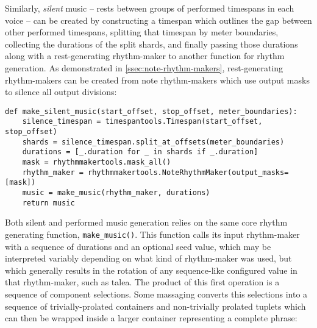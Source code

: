 \noindent Similarly, \emph{silent} music -- rests between groups of performed
timespans in each voice -- can be created by constructing a timespan which
outlines the gap between other performed timespans, splitting that timespan by
meter boundaries, collecting the durations of the split shards, and finally
passing those durations along with a rest-generating rhythm-maker to another
function for rhythm generation. As demonstrated in
\autoref{ssec:note-rhythm-makers}, rest-generating rhythm-makers can be created
from note rhythm-makers which use output masks to silence all output divisions:

\begin{comment}
<abjadextract dissertation.py.time_tools:make_silent_music />[strip_prompt]
\end{comment}

\begin{singlespacing}
\vspace{-0.5\baselineskip}
\begin{lstlisting}
def make_silent_music(start_offset, stop_offset, meter_boundaries):
    silence_timespan = timespantools.Timespan(start_offset, stop_offset)
    shards = silence_timespan.split_at_offsets(meter_boundaries)
    durations = [_.duration for _ in shards if _.duration]
    mask = rhythmmakertools.mask_all()
    rhythm_maker = rhythmmakertools.NoteRhythmMaker(output_masks=[mask])
    music = make_music(rhythm_maker, durations)
    return music
\end{lstlisting}
\end{singlespacing}

\noindent Both silent and performed music generation relies on the same core
rhythm generating function, \texttt{make\_music()}. This function calls its
input rhythm-maker with a sequence of durations and an optional seed value,
which may be interpreted variably depending on what kind of rhythm-maker was
used, but which generally results in the rotation of any sequence-like
configured value in that rhythm-maker, such as talea. The product of this first
operation is a sequence of component selections. Some massaging converts this
selections into a sequence of trivially-prolated containers and non-trivially
prolated tuplets which can then be wrapped inside a larger container
representing a complete phrase:

\begin{comment}
<abjadextract dissertation.py.time_tools:make_music />[strip_prompt]
\end{comment}

